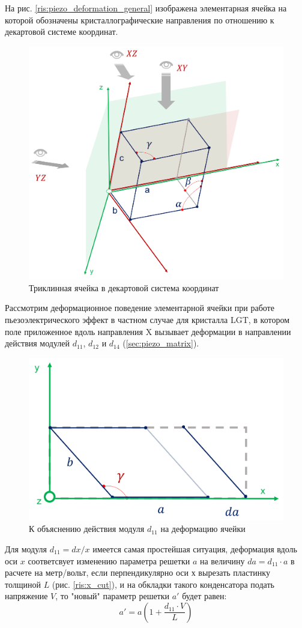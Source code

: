 На рис. \ref{ris:piezo_deformation_general} изображена элементарная ячейка
на которой обозначены кристаллографические направления по отношению к декартовой
системе координат.

\begin{figure}[H]
  \centering
  \includegraphics[width=.6\textwidth]{images/piezo_deformation_general.png}
  \caption{Триклинная ячейка в декартовой система координат}
  \label{ris:piezo_deformation_general}
\label{ris:}
\end{figure}



Рассмотрим деформационное поведение элементарной ячейки при работе пьезоэлектрического
эффект в частном случае для кристалла LGT, в котором поле приложенное вдоль направления X
вызывает деформации в направлении действия модулей $d_{11}$, $d_{12}$ и $d_{14}$ (\ref{sec:piezo_matrix}).

\begin{figure}[H]
  \centering
  \includegraphics[width=.5\textwidth]{images/d11.png}
  \caption{К объяснению действия модуля $d_{11}$ на деформацию ячейки}
  \label{ris:d11}
\end{figure}

Для модуля $d_{11}=dx/x$ имеется самая простейшая ситуация, деформация вдоль оси $x$
соответсвует изменению параметра решетки $a$ на величину $da = d_{11}\cdot a$ в расчете
на метр/вольт, если перпендикулярно оси $х$ вырезать пластинку толщиной $L$
(рис. \ref{ris:x_cut}), и на обкладки такого конденсатора подать напряжение
$V$, то "новый" параметр решетки $a{'}$ будет равен:
\begin{equation}
   a{'}  = a \left(1+\frac{d_{11}\cdot V }{L}\right)
   \label{eq:a_deformed}
\end{equation}

